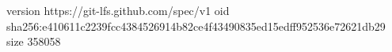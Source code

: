version https://git-lfs.github.com/spec/v1
oid sha256:e410611c2239fcc4384526914b82ce4f43490835ed15edff952536e72621db29
size 358058
